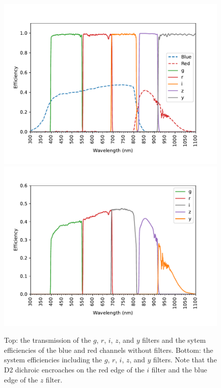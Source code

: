 \begin{figure}
\centering
\includegraphics[width=0.80\linewidth]{figure/filters-0.pdf}
\includegraphics[width=0.80\linewidth]{figure/system-filters-0.pdf}
\caption{Top: the transmission of the $g$, $r$, $i$, $z$, and $y$ filters and the sytem efficiencies of the blue and red channels without filters. Bottom: the system efficiencies including the $g$, $r$, $i$, $z$, and $y$ filters. Note that the D2 dichroic encroaches on the red edge of the $i$ filter and the blue edge of the $z$ filter.}
\label{figure:system-filters-grizy}
\end{figure}

